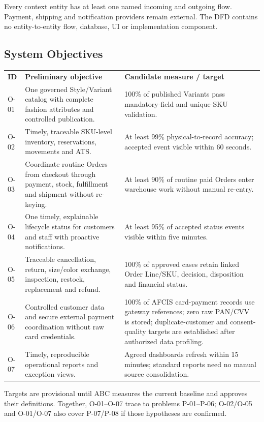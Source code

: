 \documentclass[10pt,a4paper]{article}
\begin{document}
\footnotesize Every context entity has at least one named incoming and outgoing flow. Payment, shipping and notification providers remain external. The DFD contains no entity-to-entity flow, database, UI or implementation component.
\clearpage

\subsection{System Objectives}
\small
\begin{tabularx}{\textwidth}{L{10mm}Y L{52mm}}
\textbf{ID} & \textbf{Preliminary objective} & \textbf{Candidate measure / target}\\
O-01 & One governed Style/Variant catalog with complete fashion attributes and controlled publication. & 100\% of published Variants pass mandatory-field and unique-SKU validation.\\
O-02 & Timely, traceable SKU-level inventory, reservations, movements and ATS. & At least 99\% physical-to-record accuracy; accepted event visible within 60 seconds.\\
O-03 & Coordinate routine Orders from checkout through payment, stock, fulfillment and shipment without re-keying. & At least 90\% of routine paid Orders enter warehouse work without manual re-entry.\\
O-04 & One timely, explainable lifecycle status for customers and staff with proactive notifications. & At least 95\% of accepted status events visible within five minutes.\\
O-05 & Traceable cancellation, return, size/color exchange, inspection, restock, replacement and refund. & 100\% of approved cases retain linked Order Line/SKU, decision, disposition and financial status.\\
O-06 & Controlled customer data and secure external payment coordination without raw card credentials. & 100\% of AFCIS card-payment records use gateway references; zero raw PAN/CVV is stored; duplicate-customer and consent-quality targets are established after authorized data profiling.\\
O-07 & Timely, reproducible operational reports and exception views. & Agreed dashboards refresh within 15 minutes; standard reports need no manual source consolidation.\\
\end{tabularx}

Targets are provisional until ABC measures the current baseline and approves their definitions. Together, O-01--O-07 trace to problems P-01--P-06; O-02/O-05 and O-01/O-07 also cover P-07/P-08 if those hypotheses are confirmed.
\end{document}
